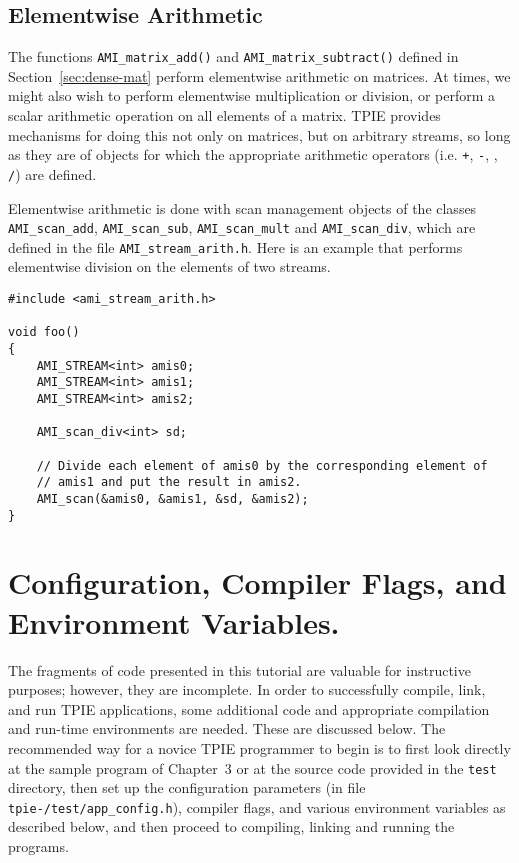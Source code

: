 \subsection{Elementwise Arithmetic}
\label{sec:elementwise}

The functions \verb|AMI_matrix_add()|
and \verb|AMI_matrix_subtract()| defined in
Section~\ref{sec:dense-mat} perform elementwise arithmetic on
matrices.  At times, we might also wish to perform elementwise
multiplication or division, or perform a scalar arithmetic operation
on all elements of a matrix.  TPIE provides mechanisms for doing this
not only on matrices, but on arbitrary streams, so long as they are of
objects for which the appropriate arithmetic operators (i.e. {\tt +},
{\tt -}, {\tt *}, {\tt /}) are defined.

Elementwise arithmetic is done with scan management objects
 of the classes
\verb|AMI_scan_add|, \verb|AMI_scan_sub|, \verb|AMI_scan_mult| and
\verb|AMI_scan_div|, which are defined in the file
\verb|AMI_stream_arith.h|.  Here is an example that performs
elementwise division on the elements of two streams.

\begin{verbatim}
#include <ami_stream_arith.h>

void foo()
{
    AMI_STREAM<int> amis0;
    AMI_STREAM<int> amis1;
    AMI_STREAM<int> amis2;

    AMI_scan_div<int> sd;

    // Divide each element of amis0 by the corresponding element of
    // amis1 and put the result in amis2.
    AMI_scan(&amis0, &amis1, &sd, &amis2);
}
\end{verbatim}


\section{Configuration, Compiler Flags, and Environment Variables.}
\label{sec:complete}

The fragments of code presented in this tutorial are valuable for
instructive purposes; however, they are incomplete.  In order to
successfully compile, link, and run TPIE applications, some additional
code and appropriate compilation and run-time environments are needed.
These are discussed below.  The recommended way for a novice TPIE programmer
to begin is to first look directly at the sample program
of Chapter~3 or at the source code provided in
the {\tt test} directory, then set up the configuration
parameters (in file {\tt
  tpie-\version/test/app\_config.h}),  compiler flags, 
and various environment variables as described below, and then
proceed to compiling, linking and running the programs.



